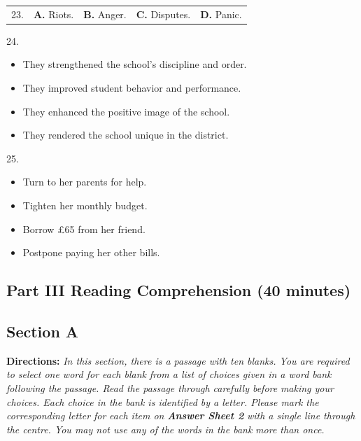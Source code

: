 \documentclass[UTF8,11pt]{ctexart}
\begin{document}
\noindent\begin{tabularx}{\linewidth}{@{}lXXXX@{}}23. & \textbf{A.} Riots. & \textbf{B.} Anger. & \textbf{C.} Disputes. & \textbf{D.} Panic.\\\end{tabularx}\par

24.


\begin{itemize}[leftmargin=2em,itemsep=.2em,topsep=.4em]\item[A.] They strengthened the school’s discipline and order.
\item[B.] They improved student behavior and performance.
\item[C.] They enhanced the positive image of the school.
\item[D.] They rendered the school unique in the district.
\end{itemize}

25.


\begin{itemize}[leftmargin=2em,itemsep=.2em,topsep=.4em]\item[A.] Turn to her parents for help.
\item[B.] Tighten her monthly budget.
\item[C.] Borrow £65 from her friend.
\item[D.] Postpone paying her other bills.
\end{itemize}

\subsection*{\textbf{Part III Reading Comprehension (40 minutes)}}


\subsection*{\textbf{Section A}}


\textbf{Directions:} \textit{In this section, there is a passage with ten blanks. You are required to select one word for each blank} \textit{from a list of choices given in a word bank following the passage. Read the passage through carefully before} \textit{making your choices. Each choice in the bank is identified by a letter. Please mark the corresponding letter for} \textit{each item on }\textbf{\textit{Answer Sheet 2}}\textit{ with a single line through the centre. You may not use any of the words in the bank} \textit{more than once.}
\end{document}
